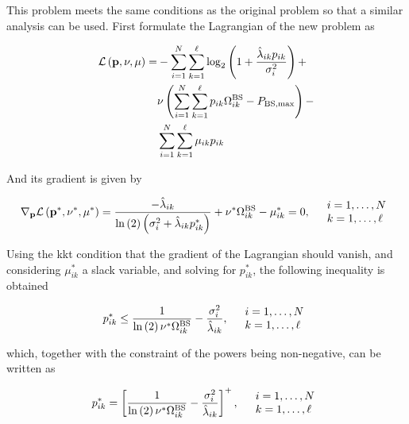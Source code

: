 This problem meets the same conditions as the original problem so that a similar
analysis can be used. First formulate the Lagrangian of the new problem as

\begin{equation} \label{eq:modif_wf_lagrangian}
\begin{aligned}
    \mathcal{L}\left(\mathbf{p}, \nu, \mathbf{\mu}\right) =
    & -\sum\limits_{i = 1}^N
        \sum\limits_{k = 1}^\ell \log_2\left( 1 +
        \frac{\hat{\lambda}_{ik} p_{ik}}{\sigma_i^2} \right) + \\
    & \nu\left(
        \sum\limits_{i = 1}^N \sum\limits_{k = 1}^\ell p_{ik} \Omega_{ik}^{\text{BS}} -
        P_{\text{BS},\max}\right) - \\
    & \sum\limits_{i = 1}^N \sum\limits_{k = 1}^\ell \mu_{ik} p_{ik}
\end{aligned}
\end{equation}

And its gradient is given by

\begin{equation} \label{eq:modif_wf_gradient}
    \mathbf{\nabla}_{\mathbf{p}} \mathcal{L}\left(\mathbf{p}^\ast, \nu^\ast, \mathbf{\mu}^{\ast}
    \right) = 
    \frac{-\hat{\lambda}_{ik}}{\ln\left(2\right)\left(\sigma_i^2 +
    \hat{\lambda}_{ik} p_{ik}^\ast\right)} +
    \nu^\ast \Omega_{ik}^{\text{BS}} - \mu_{ik}^\ast = 0,\quad
	\begin{array}{l}
	i = 1, \ldots, N\\
	k = 1, \ldots, \ell
	\end{array}\\
\end{equation}

Using the \gls{kkt} condition that the gradient of the Lagrangian should vanish,
and considering $\mu_{ik}^\ast$ a slack variable, and solving for $p_{ik}^\ast$,
the following inequality is obtained

\begin{equation} \label{eq:modified_wf_gradient_ineq}
    p_{ik}^\ast \leq \frac{1}{\ln\left(2\right)\nu^\ast\Omega_{ik}^{\text{BS}}} -
    \frac{\sigma_i^2}{\hat{\lambda}_{ik}}, \quad 
	\begin{array}{l}
	i = 1, \ldots, N\\
	k = 1, \ldots, \ell
	\end{array}
\end{equation}

\noindent
which, together with the constraint of the powers being non-negative, can be
written as

\begin{equation} \label{eq:mwf}
    p_{ik}^\ast = \left[\frac{1}{\ln\left(2\right)\nu^\ast\Omega_{ik}^{\text{BS}}} - 
    \frac{\sigma_i^2}{\hat{\lambda}_{ik}}\right]^+, \quad 
	\begin{array}{l}
	i = 1, \ldots, N\\
	k = 1, \ldots, \ell
	\end{array}
\end{equation}

